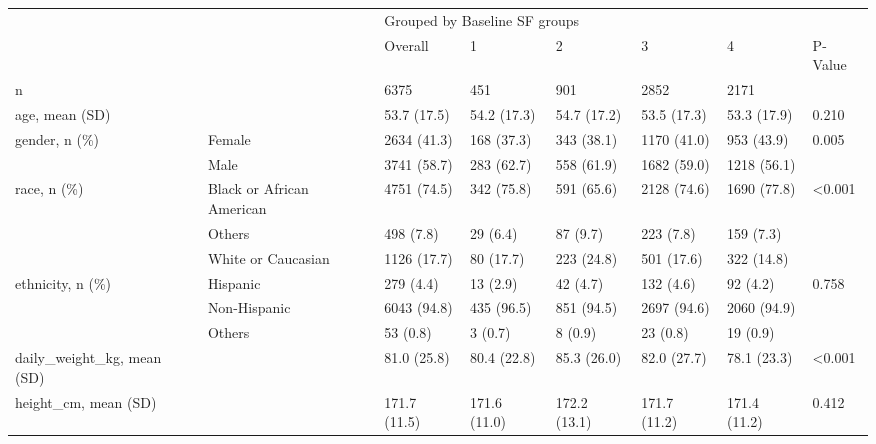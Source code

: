 \begin{tabular}{llllllll}
\toprule
                                 &        & \multicolumn{6}{l}{Grouped by Baseline SF groups} \\
                                 &        &                       Overall &              1 &              2 &              3 &               4 & P-Value \\
\midrule
n & {} &                          6375 &            451 &            901 &           2852 &            2171 &         \\
age, mean (SD) &        &                   53.7 (17.5) &    54.2 (17.3) &    54.7 (17.2) &    53.5 (17.3) &     53.3 (17.9) &   0.210 \\
gender, n (\%) & Female &                   2634 (41.3) &     168 (37.3) &     343 (38.1) &    1170 (41.0) &      953 (43.9) &   0.005 \\
                                 & Male &                   3741 (58.7) &     283 (62.7) &     558 (61.9) &    1682 (59.0) &     1218 (56.1) &         \\
race, n (\%) & Black or African American &                   4751 (74.5) &     342 (75.8) &     591 (65.6) &    2128 (74.6) &     1690 (77.8) &  <0.001 \\
                                 & Others &                     498 (7.8) &       29 (6.4) &       87 (9.7) &      223 (7.8) &       159 (7.3) &         \\
                                 & White or Caucasian &                   1126 (17.7) &      80 (17.7) &     223 (24.8) &     501 (17.6) &      322 (14.8) &         \\
ethnicity, n (\%) & Hispanic &                     279 (4.4) &       13 (2.9) &       42 (4.7) &      132 (4.6) &        92 (4.2) &   0.758 \\
                                 & Non-Hispanic &                   6043 (94.8) &     435 (96.5) &     851 (94.5) &    2697 (94.6) &     2060 (94.9) &         \\
                                 & Others &                      53 (0.8) &        3 (0.7) &        8 (0.9) &       23 (0.8) &        19 (0.9) &         \\
daily\_weight\_kg, mean (SD) &        &                   81.0 (25.8) &    80.4 (22.8) &    85.3 (26.0) &    82.0 (27.7) &     78.1 (23.3) &  <0.001 \\
height\_cm, mean (SD) &        &                  171.7 (11.5) &   171.6 (11.0) &   172.2 (13.1) &   171.7 (11.2) &    171.4 (11.2) &   0.412 \\

\end{tabular}
